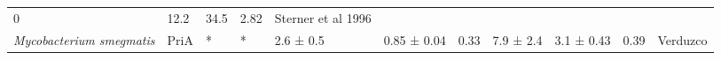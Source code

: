 \documentclass[12pt,twoside]{reedthesis}
\begin{document}
\begin{longtable}[]{@{}lllllllllll@{}}
\begin{minipage}[t]{0.06\columnwidth}
  0\strut
  \end{minipage} & \begin{minipage}[t]{0.05\columnwidth}\raggedright\strut
  12.2\strut
  \end{minipage} & \begin{minipage}[t]{0.05\columnwidth}\raggedright\strut
  34.5\strut
  \end{minipage} & \begin{minipage}[t]{0.03\columnwidth}\raggedright\strut
  2.82\strut
  \end{minipage} & \begin{minipage}[t]{0.11\columnwidth}\raggedright\strut
  Sterner et al 1996\strut
  \end{minipage}\tabularnewline
  \begin{minipage}[t]{0.15\columnwidth}\raggedright\strut
  \emph{Mycobacterium smegmatis}\strut
  \end{minipage} & \begin{minipage}[t]{0.05\columnwidth}\raggedright\strut
  PriA\strut
  \end{minipage} & \begin{minipage}[t]{0.04\columnwidth}\raggedright\strut
  *\strut
  \end{minipage} & \begin{minipage}[t]{0.04\columnwidth}\raggedright\strut
  *\strut
  \end{minipage} & \begin{minipage}[t]{0.06\columnwidth}\raggedright\strut
  2.6 ± 0.5\strut
  \end{minipage} & \begin{minipage}[t]{0.06\columnwidth}\raggedright\strut
  0.85 ± 0.04\strut
  \end{minipage} & \begin{minipage}[t]{0.06\columnwidth}\raggedright\strut
  0.33\strut
  \end{minipage} & \begin{minipage}[t]{0.05\columnwidth}\raggedright\strut
  7.9 ± 2.4\strut
  \end{minipage} & \begin{minipage}[t]{0.05\columnwidth}\raggedright\strut
  3.1 ± 0.43\strut
  \end{minipage} & \begin{minipage}[t]{0.03\columnwidth}\raggedright\strut
  0.39\strut
  \end{minipage} & \begin{minipage}[t]{0.11\columnwidth}\raggedright\strut
  Verduzco

\end{minipage}
\end{longtable}
\end{document}
